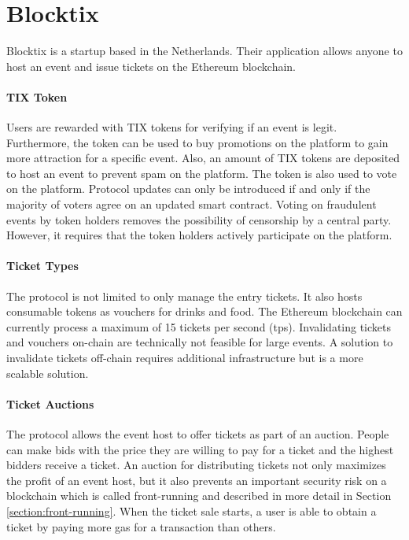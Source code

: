 
\section{Blocktix}

Blocktix \cite{blocktix-whitepaper} is a startup based in the Netherlands. Their application allows anyone to host an event and issue tickets on the Ethereum blockchain. 

\paragraph{TIX Token}
Users are rewarded with TIX tokens for verifying if an event is legit. Furthermore, the token can be used to buy promotions on the platform to gain more attraction for a specific event. Also, an amount of TIX tokens are deposited to host an event to prevent spam on the platform. The token is also used to vote on the platform. Protocol updates can only be introduced if and only if the majority of voters agree on an updated smart contract. 
Voting on fraudulent events by token holders removes the possibility of censorship by a central party. However, it requires that the token holders actively participate on the platform. 

\paragraph{Ticket Types}
The protocol is not limited to only manage the entry tickets. It also hosts consumable tokens as vouchers for drinks and food. 
The Ethereum blockchain can currently process a maximum of 15 tickets per second (tps). Invalidating tickets and vouchers on-chain are technically not feasible for large events. A solution to invalidate tickets off-chain requires additional infrastructure but is a more scalable solution. 

\paragraph{Ticket Auctions}
The protocol allows the event host to offer tickets as part of an auction. People can make bids with the price they are willing to pay for a ticket and the highest bidders receive a ticket. 
An auction for distributing tickets not only maximizes the profit of an event host, but it also prevents an important security risk on a blockchain which is called front-running and described in more detail in Section \ref{section:front-running}. When the ticket sale starts, a user is able to obtain a ticket by paying more gas for a transaction than others. 

